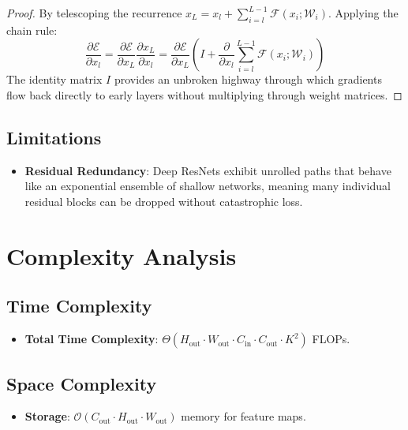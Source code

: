 \documentclass[11pt,a4paper]{article}
\theoremstyle{definition}
\begin{document}
\begin{proof}
By telescoping the recurrence $x_L = x_l + \sum_{i=l}^{L-1} \mathcal{F}(x_i; \mathcal{W}_i)$.
Applying the chain rule:
\begin{equation}
\frac{\partial \mathcal{E}}{\partial x_l} = \frac{\partial \mathcal{E}}{\partial x_L} \frac{\partial x_L}{\partial x_l} = \frac{\partial \mathcal{E}}{\partial x_L} \left( I + \frac{\partial}{\partial x_l} \sum_{i=l}^{L-1} \mathcal{F}(x_i; \mathcal{W}_i) \right)
\end{equation}
The identity matrix $I$ provides an unbroken highway through which gradients flow back directly to early layers without multiplying through weight matrices.
\end{proof}

\subsection{Limitations}
\begin{itemize}
    \item \textbf{Residual Redundancy}: Deep ResNets exhibit unrolled paths that behave like an exponential ensemble of shallow networks, meaning many individual residual blocks can be dropped without catastrophic loss.
\end{itemize}

\section{Complexity Analysis}

\subsection{Time Complexity}
\begin{itemize}
    \item \textbf{Total Time Complexity}: $\Theta(H_{\text{out}} \cdot W_{\text{out}} \cdot C_{\text{in}} \cdot C_{\text{out}} \cdot K^2)$ FLOPs.
\end{itemize}

\subsection{Space Complexity}
\begin{itemize}
    \item \textbf{Storage}: $\mathcal{O}(C_{\text{out}} \cdot H_{\text{out}} \cdot W_{\text{out}})$ memory for feature maps.
\end{itemize}
\end{document}
